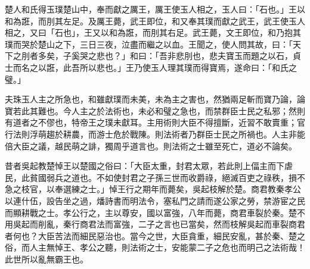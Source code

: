 
\begin{pinyinscope}
楚人和氏得玉璞楚山中，奉而獻之厲王，厲王使玉人相之，玉人曰：「石也。」王以和為誑，而刖其左足。及厲王薨，武王即位，和又奉其璞而獻之武王，武王使玉人相之，又曰「石也」，王又以和為誑，而刖其右足。武王薨，文王即位，和乃抱其璞而哭於楚山之下，三日三夜，泣盡而繼之以血。王聞之，使人問其故，曰：「天下之刖者多矣，子奚哭之悲也？」和曰：「吾非悲刖也，悲夫寶玉而題之以石，貞士而名之以誑，此吾所以悲也。」王乃使玉人理其璞而得寶焉，遂命曰：「和氏之璧。」

夫珠玉人主之所急也，和雖獻璞而未美，未為主之害也，然猶兩足斬而寶乃論，論寶若此其難也。今人主之於法術也，未必和璧之急也，而禁群臣士民之私邪；然則有道者之不僇也，特帝王之璞未獻耳。主用術則大臣不得擅斷，近習不敢賣重；官行法則浮萌趨於耕農，而游士危於戰陳。則法術者乃群臣士民之所禍也。人主非能倍大臣之議，越民萌之誹，獨周乎道言也。則法術之士雖至死亡，道必不論矣。

昔者吳起教楚悼王以楚國之俗曰：「大臣太重，封君太眾，若此則上偪主而下虐民，此貧國弱兵之道也。不如使封君之子孫三世而收爵祿，絕滅百吏之祿秩，損不急之枝官，以奉選練之士。」悼王行之期年而薨矣，吳起枝解於楚。商君教秦孝公以連什伍，設告坐之過，燔詩書而明法令，塞私門之請而遂公家之勞，禁游宦之民而顯耕戰之士。孝公行之，主以尊安，國以富強，八年而薨，商君車裂於秦。楚不用吳起而削亂，秦行商君法而富強，二子之言也已當矣，然而枝解吳起而車裂商君者何也？大臣苦法而細民惡治也。當今之世，大臣貪重，細民安亂，甚於秦、楚之俗，而人主無悼王、孝公之聽，則法術之士，安能蒙二子之危也而明己之法術哉！此世所以亂無霸王也。


\end{pinyinscope}